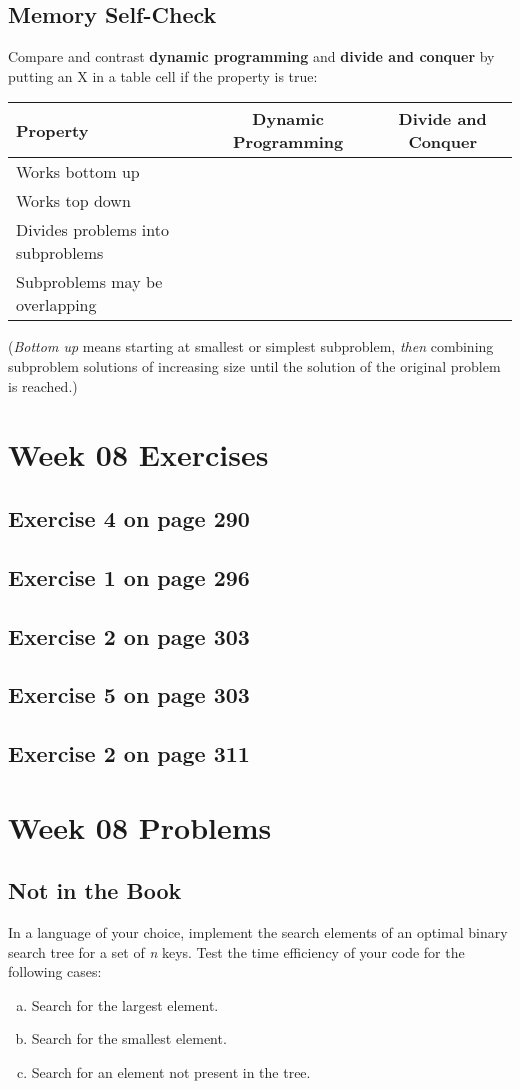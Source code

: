 \documentclass[12pt]{amsart}
\begin{document}
\subsection{Memory Self-Check}
Compare and contrast \textbf{dynamic programming} and \textbf{divide and conquer} by putting an X in a table cell if the property is true:
 
 \begin{tabular}{|l|c|c|}
 \hline
 Property&Dynamic Programming& Divide and Conquer\\
 \hline
 Works bottom up&&\\
 \hline
 Works top down&&\\
 \hline
 Divides problems into subproblems&&\\
 \hline
 Subproblems may be overlapping&&\\
 \hline
 \end{tabular}
(\textit{Bottom up} means starting at smallest or simplest subproblem, \textit{then} combining subproblem solutions of increasing size until the solution of the original problem is reached.)


 \section{Week 08 Exercises}
\subsection{ Exercise 4 on page 290} 
\subsection{ Exercise 1 on page 296} 
\subsection{Exercise 2 on page 303} 
\subsection{Exercise 5 on page 303} 
\subsection{Exercise 2 on page 311}


\section{Week 08 Problems}
\subsection{Not in the Book}
In a language of your choice, implement the search elements of an optimal binary search tree for a set of \textit{n} keys. Test the time efficiency of your code for the following cases:
\begin{enumerate}[(a)]
\item Search for the largest element.
\item Search for the smallest element.
\item Search for an element not present in the tree.
\end{enumerate}
\end{document}
